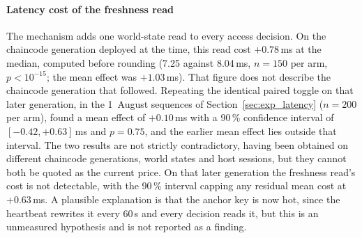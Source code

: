 \documentclass[preprint,12pt]{elsarticle}
\begin{document}
\paragraph{Latency cost of the freshness read}
The mechanism adds one world-state read to every access decision. On the
chaincode generation deployed at the time, this read cost $+0.78$\,ms at the
median, computed before rounding (7.25 against 8.04\,ms, $n=150$ per arm,
$p<10^{-15}$; the mean effect was $+1.03$\,ms). That figure
does not describe the chaincode generation that followed. Repeating the
identical paired toggle on that later generation, in the 1~August sequences of
Section~\ref{sec:exp_latency} ($n=200$ per arm), found a mean effect of
$+0.10$\,ms with a 90\,\% confidence interval of $[-0.42, +0.63]$\,ms and
$p = 0.75$, and the earlier mean effect lies outside that interval. The two
results are not strictly contradictory, having been obtained on different
chaincode generations, world states and host sessions, but they cannot both be
quoted as the current price. On that later generation the freshness read's cost is
not detectable, with the 90\,\% interval capping any residual mean cost at
$+0.63$\,ms. A
plausible explanation is that the anchor key is now hot, since the heartbeat
rewrites it every 60\,s and every decision reads it, but this is an unmeasured
hypothesis and is not reported as a finding.
\end{document}
